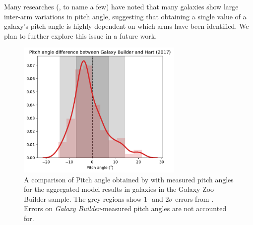 \documentclass[../main.tex]{subfiles}
\begin{document}
Many researches (\citealt{Davis2014:1402.1910v1}, \citealt{2019arXiv190804246D} to name a few) have noted that many galaxies show large inter-arm variations in pitch angle, suggesting that obtaining a single value of a galaxy's pitch angle is highly dependent on which arms have been identified. We plan to further explore this issue in a future work.

\begin{figure}
  \includegraphics[width=8cm]{images__results/gzb-hart-comparison.pdf}
  \caption{A comparison of Pitch angle obtained by \citet{Hart2016:1607.01019v1} with measured pitch angles for the aggregated model results in galaxies in the Galaxy Zoo Builder sample. The grey regions show 1- and $2\sigma$ errors from \citet{Hart2016:1607.01019v1}. Errors on \textit{Galaxy Builder}-measured pitch angles are not accounted for.}
  \label{fig:hart_pitch_angle}
\end{figure}
\end{document}
